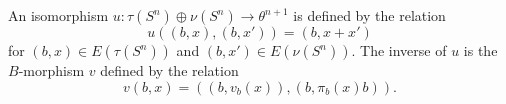 An isomorphism $u \colon \tau(S^n) \oplus \nu(S^n) \rightarrow \theta^{n+1}$ is defined by the relation
$$u((b, x), (b, x')) = (b, x + x')$$
for $(b, x) \in E(\tau(S^n))$ and $(b, x') \in E(\nu(S^n))$. The inverse of $u$ is the $B$-morphism $v$ defined by the relation
$$v(b, x) = ((b, v_b(x)), (b, \pi_b(x) b)).$$
